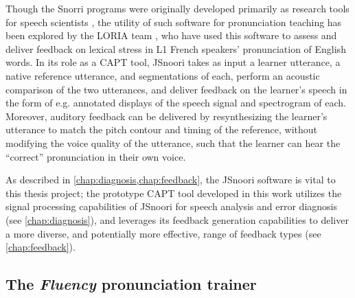 	Though the Snorri programs were originally developed primarily as research tools for speech scientists %
	\citep{Fohr1989,Laprie1999}, 
	the utility of such software
	for pronunciation teaching has been explored by the LORIA team \citep{Bonneau2004,Henry2007,Bonneau2011},
	who have used 
	this software to assess and deliver feedback on lexical stress in L1 French speakers' pronunciation of English words. 
In its role as a CAPT tool, JSnoori 
takes as input a learner utterance, a native reference utterance, and segmentations of each, perform an acoustic comparison of the two utterances, and deliver feedback on the learner's speech in the form of e.g. annotated displays of the speech signal and spectrogram of each. Moreover, auditory feedback can be delivered 
by
resynthesizing the learner's utterance to match the pitch contour and timing of the reference, without modifying the voice quality of the utterance, such that the learner can hear the ``correct'' pronunciation in their own voice. 
%

	

As described in \cref{chap:diagnosis,chap:feedback}, 
the JSnoori software is vital to this thesis project;
the prototype CAPT tool developed in this work 
utilizes the signal processing capabilities of JSnoori 
for speech analysis and error diagnosis (see \cref{chap:diagnosis}), 
and leverages its feedback generation capabilities to deliver  a more diverse, and potentially more effective, range of feedback types (see \cref{chap:feedback}). 
	

	\subsection{The \textit{Fluency} pronunciation trainer}
	\label{sec:capt:fluency}
	
